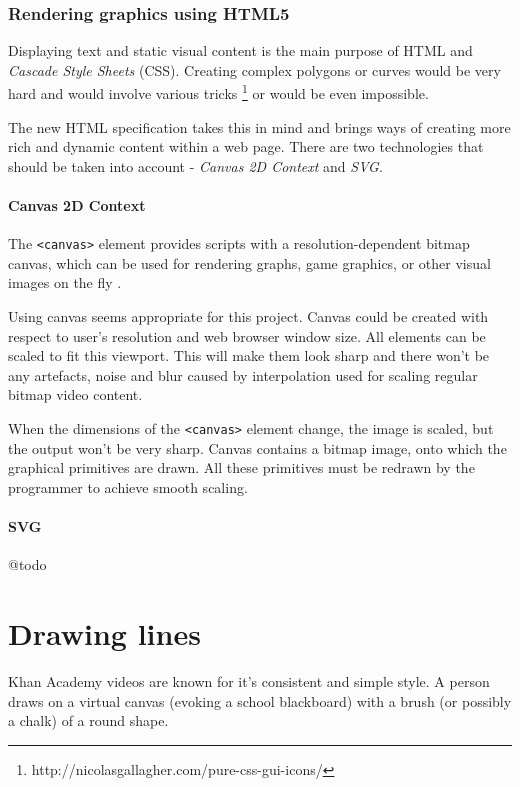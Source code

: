 \subsubsection{Rendering graphics using HTML5}

Displaying text and static visual content is the main purpose of HTML and \textit{Cascade Style Sheets} (CSS). Creating complex polygons or curves would be very hard and would involve various tricks \footnote{http://nicolasgallagher.com/pure-css-gui-icons/} or would be even impossible. 

The new HTML specification takes this in mind and brings ways of creating more rich and dynamic content within a web page. There are two technologies that should be taken into account - \textit{Canvas 2D Context} and \textit{SVG}.

\paragraph{Canvas 2D Context}
The \verb|<canvas>| element provides scripts with a resolution-dependent bitmap canvas, which can be used for rendering graphs, game graphics, or other visual images on the fly \cite{html5_canvas}. 

Using canvas seems appropriate for this project. Canvas could be created with respect to user's resolution and web browser window size. All elements can be scaled to fit this viewport. This will make them look sharp and there won't be any artefacts, noise and blur caused by interpolation used for scaling regular bitmap video content.

When the dimensions of the \verb|<canvas>| element change, the image is scaled, but the output won't be very sharp. Canvas contains a bitmap image, onto which the graphical primitives are drawn. All these primitives must be redrawn by the programmer to achieve smooth scaling.

\paragraph{SVG} @todo










\section{Drawing lines}
Khan Academy videos are known for it's consistent and simple style. A person draws on a virtual canvas (evoking a school blackboard) with a brush (or possibly a chalk) of a round shape.

